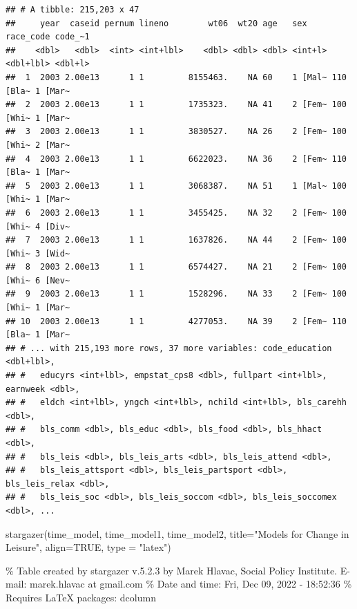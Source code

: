 \documentclass[
]{article}
\newenvironment{Shaded}{\begin{snugshade}}{\end{snugshade}}
\newcommand{\AttributeTok}[1]{\textcolor[rgb]{0.77,0.63,0.00}{#1}}
\newcommand{\ConstantTok}[1]{\textcolor[rgb]{0.00,0.00,0.00}{#1}}
\newcommand{\FunctionTok}[1]{\textcolor[rgb]{0.00,0.00,0.00}{#1}}
\newcommand{\NormalTok}[1]{#1}
\newcommand{\StringTok}[1]{\textcolor[rgb]{0.31,0.60,0.02}{#1}}
\begin{document}
\begin{verbatim}
## # A tibble: 215,203 x 47
##     year  caseid pernum lineno        wt06  wt20 age   sex     race_code code_~1
##    <dbl>   <dbl>  <int> <int+lbl>    <dbl> <dbl> <dbl> <int+l> <dbl+lbl> <dbl+l>
##  1  2003 2.00e13      1 1         8155463.    NA 60    1 [Mal~ 110 [Bla~ 1 [Mar~
##  2  2003 2.00e13      1 1         1735323.    NA 41    2 [Fem~ 100 [Whi~ 1 [Mar~
##  3  2003 2.00e13      1 1         3830527.    NA 26    2 [Fem~ 100 [Whi~ 2 [Mar~
##  4  2003 2.00e13      1 1         6622023.    NA 36    2 [Fem~ 110 [Bla~ 1 [Mar~
##  5  2003 2.00e13      1 1         3068387.    NA 51    1 [Mal~ 100 [Whi~ 1 [Mar~
##  6  2003 2.00e13      1 1         3455425.    NA 32    2 [Fem~ 100 [Whi~ 4 [Div~
##  7  2003 2.00e13      1 1         1637826.    NA 44    2 [Fem~ 100 [Whi~ 3 [Wid~
##  8  2003 2.00e13      1 1         6574427.    NA 21    2 [Fem~ 100 [Whi~ 6 [Nev~
##  9  2003 2.00e13      1 1         1528296.    NA 33    2 [Fem~ 100 [Whi~ 1 [Mar~
## 10  2003 2.00e13      1 1         4277053.    NA 39    2 [Fem~ 110 [Bla~ 1 [Mar~
## # ... with 215,193 more rows, 37 more variables: code_education <dbl+lbl>,
## #   educyrs <int+lbl>, empstat_cps8 <dbl>, fullpart <int+lbl>, earnweek <dbl>,
## #   eldch <int+lbl>, yngch <int+lbl>, nchild <int+lbl>, bls_carehh <dbl>,
## #   bls_comm <dbl>, bls_educ <dbl>, bls_food <dbl>, bls_hhact <dbl>,
## #   bls_leis <dbl>, bls_leis_arts <dbl>, bls_leis_attend <dbl>,
## #   bls_leis_attsport <dbl>, bls_leis_partsport <dbl>, bls_leis_relax <dbl>,
## #   bls_leis_soc <dbl>, bls_leis_soccom <dbl>, bls_leis_soccomex <dbl>, ...
\end{verbatim}

\begin{Shaded}
\begin{Highlighting}[]
\FunctionTok{stargazer}\NormalTok{(time\_model, time\_model1, time\_model2, }\AttributeTok{title=}\StringTok{"Models for Change in Leisure"}\NormalTok{, }\AttributeTok{align=}\ConstantTok{TRUE}\NormalTok{, }\AttributeTok{type =} \StringTok{"latex"}\NormalTok{)}
\end{Highlighting}
\end{Shaded}

\% Table created by stargazer v.5.2.3 by Marek Hlavac, Social Policy
Institute. E-mail: marek.hlavac at gmail.com \% Date and time: Fri, Dec
09, 2022 - 18:52:36 \% Requires LaTeX packages: dcolumn
\end{document}
